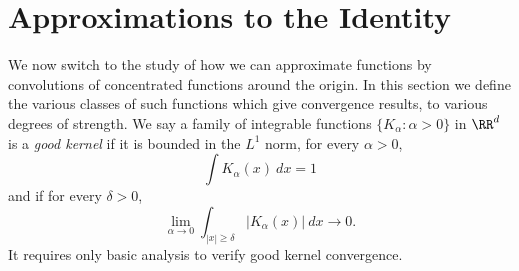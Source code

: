 \section{Approximations to the Identity}

We now switch to the study of how we can approximate functions by convolutions of concentrated functions around the origin. In this section we define the various classes of such functions which give convergence results, to various degrees of strength. We say a family of integrable functions $\{ K_\alpha : \alpha > 0 \}$ in $\RR^d$ is a \emph{good kernel} if it is bounded in the $L^1$ norm, for every $\alpha > 0$,
%
\[ \int K_\alpha(x)\ dx = 1 \]
%
and if for every $\delta > 0$,
%
\[ \lim_{\alpha \to 0} \int_{|x| \geq \delta} |K_\alpha(x)|\ dx \to 0. \]
%
It requires only basic analysis to verify good kernel convergence.

